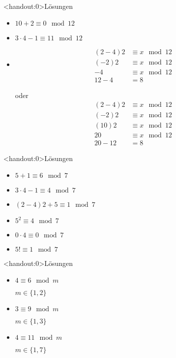 {\begin{frame}<handout:0>{Lösungen}
    \begin{itemize}[<+- | alert@+>]
        \item $10+2 \equiv 0 \mod 12$
        \item $3\cdot 4-1 \equiv 11 \mod 12$
        \item
              \begin{align*}
                  (2-4)2 & \equiv x \mod 12 \\
                  (-2)2  & \equiv x \mod 12 \\
                  -4     & \equiv x \mod 12 \\
                  12-4   & =8
              \end{align*}

              oder
              \begin{align*}
                  (2-4)2 & \equiv x \mod 12 \\
                  (-2)2  & \equiv x \mod 12 \\
                  (10)2  & \equiv x \mod 12 \\
                  20     & \equiv x \mod 12 \\
                  20-12  & = 8
              \end{align*}
    \end{itemize}
\end{frame}

\begin{frame}<handout:0>{Lösungen}
    \begin{itemize}[<+- | alert@+>]
        \item $5 + 1      \equiv 6 \mod 7$
        \item $3\cdot4-1  \equiv 4 \mod 7$
        \item $(2-4)2+5   \equiv 1 \mod 7$
        \item $5^2        \equiv 4 \mod 7$
        \item $0\cdot4    \equiv 0 \mod 7$
        \item $5!         \equiv 1 \mod 7$
    \end{itemize}
\end{frame}

\begin{frame}<handout:0>{Lösungen}
    \begin{itemize}[<+- | alert@+>]
        \item $4 \equiv 6 \mod m$

              $m \in \{1,2\}$
        \item $3 \equiv 9 \mod m$

              $m \in \{1,3\}$
        \item $4 \equiv 11 \mod m$

              $m \in \{1,7\}$
    \end{itemize}
\end{frame}
}

